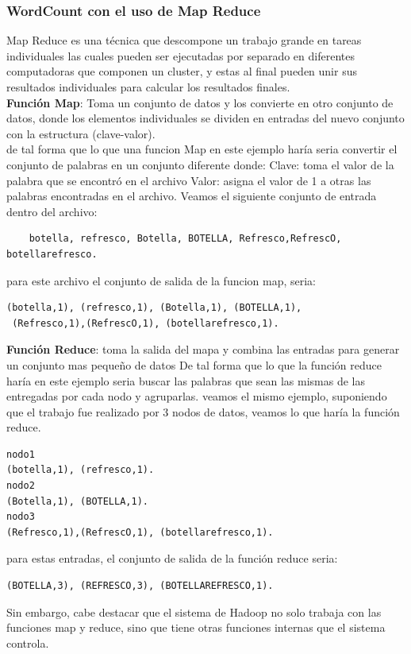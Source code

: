\subsubsection{WordCount con el uso de Map Reduce}
Map Reduce es una técnica que descompone un trabajo grande en tareas individuales las cuales pueden ser ejecutadas por separado en diferentes computadoras que componen un cluster, y estas al final pueden unir sus resultados individuales para calcular los resultados finales.
\\
\label{funcionmap}
\textbf{Función Map}: Toma un conjunto de datos y los convierte en otro conjunto de datos, donde los elementos individuales se dividen en entradas del nuevo conjunto con la estructura (clave-valor).
 \\
de tal forma que lo que una funcion Map en este ejemplo haría seria convertir el conjunto de palabras en un conjunto diferente donde:
Clave: toma el valor de la palabra que se encontró en el archivo
Valor: asigna el valor de 1 a otras las palabras encontradas en el archivo.
Veamos el siguiente conjunto de entrada dentro del archivo:
\begin{lstlisting} 
	botella, refresco, Botella, BOTELLA, Refresco,RefrescO, botellarefresco. 
\end{lstlisting} 
para este archivo el conjunto de salida de la funcion map, seria:
\begin{lstlisting} 
(botella,1), (refresco,1), (Botella,1), (BOTELLA,1),
 (Refresco,1),(RefrescO,1), (botellarefresco,1). 
\end{lstlisting} 
\label{funcionreduce}
\textbf{Función Reduce}: toma la salida del mapa y combina las entradas para generar un conjunto mas pequeño de datos
De tal forma que lo que la función reduce haría en este ejemplo seria buscar las palabras que sean las mismas de las entregadas por cada nodo y agruparlas. 
veamos el mismo ejemplo, suponiendo que el trabajo fue realizado por 3 nodos de datos, veamos lo que haría la función reduce.
\begin{lstlisting} 
nodo1
(botella,1), (refresco,1).
nodo2
(Botella,1), (BOTELLA,1).
nodo3
(Refresco,1),(RefrescO,1), (botellarefresco,1). 
\end{lstlisting} 
para estas entradas, el conjunto de salida de la función reduce seria:
\begin{lstlisting} 
(BOTELLA,3), (REFRESCO,3), (BOTELLAREFRESCO,1).
\end{lstlisting} 
Sin embargo, cabe destacar que el sistema de Hadoop no solo trabaja con las funciones map y reduce, sino que tiene otras funciones internas que el sistema controla.
